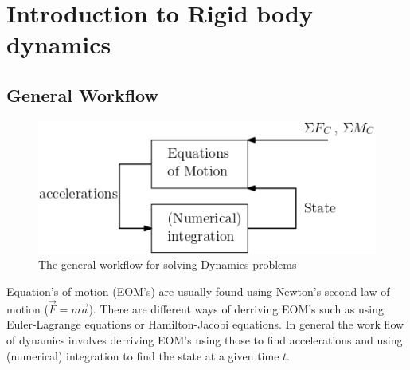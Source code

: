 \documentclass[11pt, a4paper]{article}
\begin{document}
\section{Introduction to Rigid body dynamics}

\subsection{General Workflow}
\begin{figure}[h]
  \centerline{\includegraphics[width=120mm]{images/Dynamics_Work_Flow.png}}
  \caption{The general workflow for solving Dynamics problems}
\end{figure}
Equation's of motion (EOM's) are usually found using Newton's second law of motion ($\vec{F} = m\vec{a}$). There are different ways of derriving EOM's such as using Euler-Lagrange equations or Hamilton-Jacobi equations. In general the work flow of dynamics involves derriving EOM's using those to find accelerations and using (numerical) integration to find the state at a given time $t$.
\end{document}

